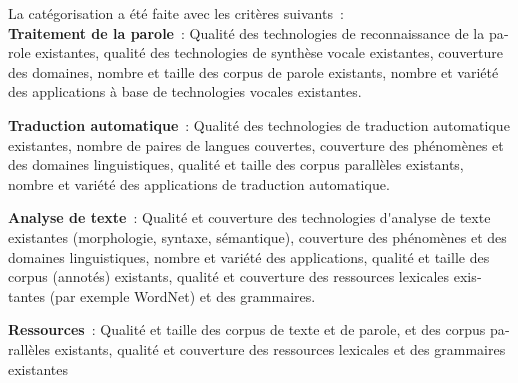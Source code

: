 \documentclass[]{../metanetpaper}
\begin{document}
\begin{french}
\begin{multicols}{2}
La catégorisation a été faite avec les critères suivants~:\\

{\bf Traitement de la parole}~: Qualité des technologies de
reconnaissance de la parole existantes, qualité des technologies de
synthèse vocale existantes, couverture des domaines, nombre et taille
des corpus de parole existants, nombre et variété des applications à
base de technologies vocales existantes.

{\bf Traduction automatique}~: Qualité des technologies de traduction
automatique existantes, nombre de paires de langues couvertes,
couverture des phénomènes et des domaines linguistiques, qualité et
taille des corpus parallèles existants, nombre et variété des
applications de traduction automatique.

{\bf Analyse de texte}~: Qualité et couverture des technologies
d{\mbox '}analyse de texte existantes (morphologie, syntaxe, sémantique),
couverture des phénomènes et des domaines linguistiques, nombre et
variété des applications, qualité et taille des corpus (annotés)
existants, qualité et couverture des ressources lexicales existantes
(par exemple WordNet) et des grammaires.

{\bf Ressources}~: Qualité et taille des corpus de texte et de parole,
et des corpus parallèles existants, qualité et couverture des
ressources lexicales et des grammaires existantes


\end{multicols}
\end{french}
\end{document}
